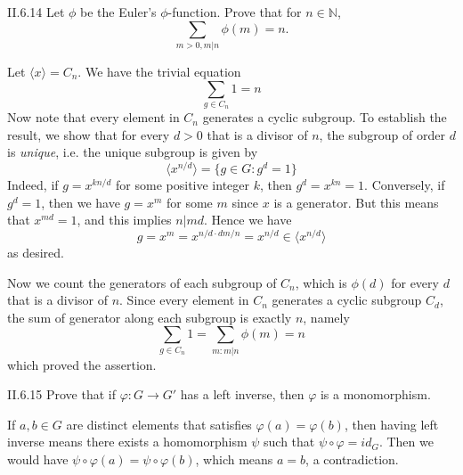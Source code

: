 \begin{problem}{II.6.14}
Let $\phi$ be the Euler's $\phi$-function. Prove that for $n \in \mathbb{N}$, 
\[
\sum_{m>0, m|n} \phi(m) = n.
\]
\end{problem}
\begin{pf}
Let $\langle x \rangle = C_n$. We have the trivial equation 
\[
\sum_{g \in C_n} 1 = n
\]
Now note that every element in $C_n$ generates a cyclic subgroup. To establish the result, we show that for every $d > 0$ that is a divisor of $n$, the subgroup of order $d$ is \emph{unique}, i.e. the unique subgroup is given by
\[
\langle x^{n/d} \rangle = \{g \in G : g^d = 1\}
\]
Indeed, if $g = x^{kn/d}$ for some positive integer $k$, then $g^d = x^{kn} = 1$. Conversely, if $g^d = 1$, then we have $g = x^m$ for some $m$ since $x$ is a generator. But this means that $x^{md} = 1$, and this implies $n|md$. Hence we have
\[
g = x^{m} = x^{n/d \cdot dm/n} = x^{n/d} \in \langle x^{n/d} \rangle
\]
as desired.

Now we count the generators of each subgroup of $C_n$, which is $\phi(d)$ for every $d$ that is a divisor of $n$. Since every element in $C_n$ generates a  cyclic subgroup $C_d$, the sum of generator along each subgroup is exactly $n$, namely
\[
\sum_{g \in C_n} 1 = \sum_{m : m|n} \phi(m) = n
\]
which proved the assertion.
\end{pf}

\begin{problem}{II.6.15}
Prove that if $\varphi:G \to G'$ has a left inverse, then $\varphi$ is a monomorphism.
\end{problem}
\begin{pf}
If $a, b \in G$ are distinct elements that satisfies $\varphi(a) = \varphi(b)$, then having left inverse means there exists a homomorphism $\psi$ such that $\psi \circ \varphi = id_G$. Then we would have $\psi \circ \varphi(a) = \psi \circ \varphi(b)$, which means $a = b$, a contradiction.
\end{pf}

\section{}

